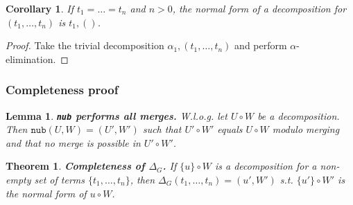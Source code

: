 \documentclass[a4paper, 11pt]{report}
\newtheorem{theorem}{Theorem}
\newtheorem{corollary}{Corollary}
\newtheorem{lemma}{Lemma}
\begin{document}
\begin{corollary}
If $t_1 = \dots = t_n$ and $n > 0$, the normal form of a decomposition for $(t_1,\dots,t_n)$ is $t_1,()$.
\label{cor:allTermsEq}
\end{corollary}

\begin{proof}
Take the trivial decomposition $\alpha_1,(t_1,\dots,t_n)$ and perform $\alpha$-elimination.
\end{proof}



\medskip


\subsubsection{Completeness proof}

\begin{lemma}
\textbf{\texttt{nub} performs all merges.}
W.l.o.g. let $U \circ W$ be a decomposition. Then $\texttt{nub}(U,W) = (U',W')$ such that $U' \circ W'$ equals $U \circ W$ modulo merging and that no merge is possible in $U' \circ W'$.
\label{thm:nubAllMerges}
\end{lemma}

\begin{theorem}
  \textbf{Completeness of $\Delta_G$.}
  If $\{u\} \circ W$ is a decomposition for a non-empty set of terms $\{t_1,\dots,t_n\}$, then $\Delta_G(t_1,\dots,t_n) = (u',W')$ s.t. $\{u'\} \circ W'$ is the normal form of $u \circ W$.
  \label{thm:DeltaGCompleteness}
\end{theorem}
\end{document}
